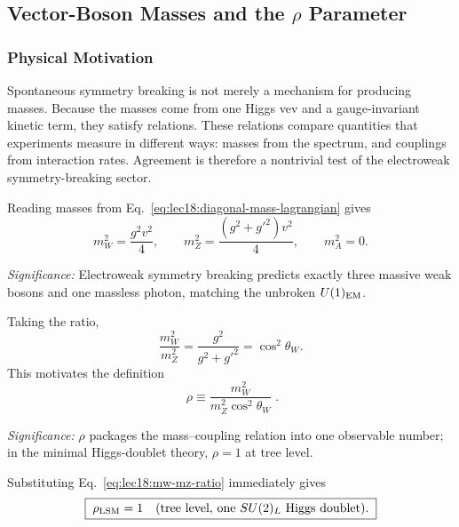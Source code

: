 \subsection{Vector-Boson Masses and the \texorpdfstring{$\rho$}{rho} Parameter}\label{subsec:lec18:rho-parameter}

\subsubsection*{Physical Motivation}

Spontaneous symmetry breaking is not merely a mechanism for producing masses.
Because the masses come from one Higgs vev and a gauge-invariant kinetic term,
they satisfy relations. These relations compare quantities that experiments
measure in different ways: masses from the spectrum, and couplings from
interaction rates. Agreement is therefore a nontrivial test of the electroweak
symmetry-breaking sector.

Reading masses from Eq.~\eqref{eq:lec18:diagonal-mass-lagrangian} gives
\begin{equation}
  \boxed{\;m_W^2=\frac{g^2v^2}{4},
  \qquad
  m_Z^2=\frac{(g^2+g'^2)v^2}{4},
  \qquad
  m_A^2=0 .\;}
  \label{eq:lec18:gauge-boson-masses}
\end{equation}

\textit{Significance:} Electroweak symmetry breaking predicts exactly three massive weak bosons and one massless photon, matching the unbroken $U(1)_{\rm EM}$.

Taking the ratio,
\begin{equation}
  \frac{m_W^2}{m_Z^2}
  =\frac{g^2}{g^2+g'^2}
  =\cos^2\theta_W .
  \label{eq:lec18:mw-mz-ratio}
\end{equation}
This motivates the definition
\begin{equation}
  \boxed{\;\rho\equiv\frac{m_W^2}{m_Z^2\cos^2\theta_W}\;} .
  \label{eq:lec18:rho-definition}
\end{equation}

\textit{Significance:} $\rho$ packages the mass--coupling relation into one observable number; in the minimal Higgs-doublet theory, $\rho=1$ at tree level.

Substituting Eq.~\eqref{eq:lec18:mw-mz-ratio} immediately gives
\begin{equation}
  \boxed{\;\rho_{\rm LSM}=1\quad\text{(tree level, one }SU(2)_L\text{ Higgs doublet).}\;}
  \label{eq:lec18:rho-one}
\end{equation}


